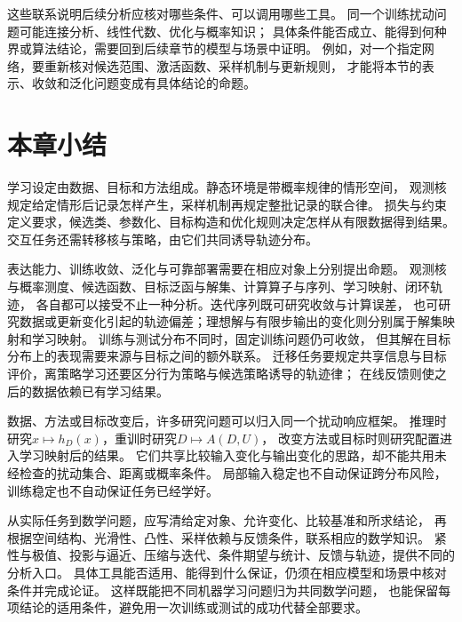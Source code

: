 这些联系说明后续分析应核对哪些条件、可以调用哪些工具。
同一个训练扰动问题可能连接分析、线性代数、优化与概率知识；
具体条件能否成立、能得到何种界或算法结论，需要回到后续章节的模型与场景中证明。
例如，对一个指定网络，要重新核对候选范围、激活函数、采样机制与更新规则，
才能将本节的表示、收敛和泛化问题变成有具体结论的命题。

\FloatBarrier
\section{本章小结}
\label{sec:future-summary}

学习设定由数据、目标和方法组成。静态环境是带概率规律的情形空间，
观测核规定给定情形后记录怎样产生，采样机制再规定整批记录的联合律。
损失与约束定义要求，候选类、参数化、目标构造和优化规则决定怎样从有限数据得到结果。
交互任务还需转移核与策略，由它们共同诱导轨迹分布。

表达能力、训练收敛、泛化与可靠部署需要在相应对象上分别提出命题。
观测核与概率测度、候选函数、目标泛函与解集、计算算子与序列、学习映射、闭环轨迹，
各自都可以接受不止一种分析。迭代序列既可研究收敛与计算误差，
也可研究数据或更新变化引起的轨迹偏差；理想解与有限步输出的变化则分别属于解集映射和学习映射。
训练与测试分布不同时，固定训练问题仍可收敛，
但其解在目标分布上的表现需要来源与目标之间的额外联系。
迁移任务要规定共享信息与目标评价，离策略学习还要区分行为策略与候选策略诱导的轨迹律；
在线反馈则使之后的数据依赖已有学习结果。

数据、方法或目标改变后，许多研究问题可以归入同一个扰动响应框架。
推理时研究$x\mapsto h_D(x)$，重训时研究$D\mapsto A(D,U)$，
改变方法或目标时则研究配置进入学习映射后的结果。
它们共享比较输入变化与输出变化的思路，却不能共用未经检查的扰动集合、距离或概率条件。
局部输入稳定也不自动保证跨分布风险，训练稳定也不自动保证任务已经学好。

从实际任务到数学问题，应写清给定对象、允许变化、比较基准和所求结论，
再根据空间结构、光滑性、凸性、采样依赖与反馈条件，联系相应的数学知识。
紧性与极值、投影与逼近、压缩与迭代、条件期望与统计、反馈与轨迹，提供不同的分析入口。
具体工具能否适用、能得到什么保证，仍须在相应模型和场景中核对条件并完成论证。
这样既能把不同机器学习问题归为共同数学问题，
也能保留每项结论的适用条件，避免用一次训练或测试的成功代替全部要求。
